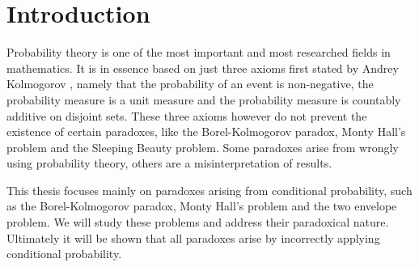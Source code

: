 \documentclass[a4paper]{report}
\theoremstyle{plain}
\theoremstyle{definition}
\theoremstyle{remark}
\numberwithin{equation}{chapter}
\DeclareMathOperator{\1}{\mathbbm{1}}
\begin{document}
\setcounter{page}{2}
\tableofcontents

\chapter{Introduction}
Probability theory is one of the most important and most researched fields in mathematics. It is in essence based on just three axioms first stated by Andrey Kolmogorov \cite{Kolmogorov33}, namely that the probability of an event is non-negative, the probability measure is a unit measure and the probability measure is countably additive on disjoint sets. These three axioms however do not prevent the existence of certain paradoxes, like the Borel-Kolmogorov paradox, Monty Hall's problem and the Sleeping Beauty problem. Some paradoxes arise from wrongly using probability theory, others are a misinterpretation of results.

This thesis focuses mainly on paradoxes arising from conditional probability, such as the Borel-Kolmogorov paradox, Monty Hall's problem and the two envelope problem. We will study these problems and address their paradoxical nature. Ultimately it will be shown that all paradoxes arise by incorrectly applying conditional probability.
\end{document}
